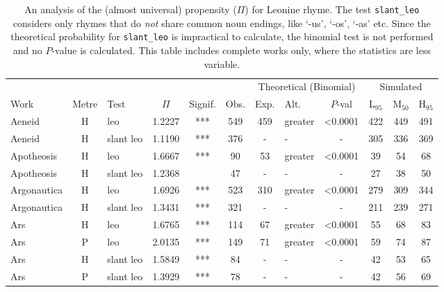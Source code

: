 \documentclass[twocolumn, switch]{article} %
\begin{document}
\begin{table}[h!]
\caption{
An analysis of the (almost universal) propensity ($\Pi$) for Leonine rhyme.
The test \texttt{slant\_leo} considers only rhymes that do \emph{not} share
common noun endings, like `-us', `-os', `-as' etc. Since the theoretical
probability for \texttt{slant\_leo} is impractical to calculate, the binomial
test is not performed and no $P$-value is calculated. This table includes
complete works only, where the statistics are less variable.
}
\label{tab:leo}
\par\medskip
\centering
  \begin{tabular}{lclcccclcc@{\hspace{1\tabcolsep}}c@{\hspace{1\tabcolsep}}c}
  \toprule
          &&&&&&\multicolumn{3}{c}{Theoretical (Binomial)}&\multicolumn{3}{c}{Simulated}\\\cmidrule(lr{2pt}){7-9}\cmidrule(l{2pt}r){10-12}
         Work & Metre &       Test &    $\Pi$ & Signif. &    Obs. &  Exp. & Alt. &  $P$-val & L$_{95}$ &  M$_{50}$ &  H$_{95}$ \\
  \midrule
        Aeneid &     H &        leo & 1.2227 &   *** &  549 &       459 &     greater & <0.0001 &  422 &  449 &  491 \\
        Aeneid &     H &  slant leo & 1.1190 &   *** &  376 &         - &        - & - &  305 &  336 &  369 \\
    Apotheosis &     H &        leo & 1.6667 &   *** &   90 &        53 &     greater & <0.0001 &   39 &   54 &   68 \\
    Apotheosis &     H &  slant leo & 1.2368 &       &   47 &         - &        - & - &   27 &   38 &   50 \\
   Argonautica &     H &        leo & 1.6926 &   *** &  523 &       310 &     greater & <0.0001 &  279 &  309 &  344 \\
   Argonautica &     H &  slant leo & 1.3431 &   *** &  321 &         - &        - & - &  211 &  239 &  271 \\
           Ars &     H &        leo & 1.6765 &   *** &  114 &        67 &     greater & <0.0001 &   55 &   68 &   83 \\
           Ars &     P &        leo & 2.0135 &   *** &  149 &        71 &     greater & <0.0001 &   59 &   74 &   87 \\
           Ars &     H &  slant leo & 1.5849 &   *** &   84 &         - &        - & - &   42 &   53 &   65 \\
           Ars &     P &  slant leo & 1.3929 &   *** &   78 &         - &        - & - &   42 &   56 &   69 \\

\end{tabular}
\end{table}
\end{document}

